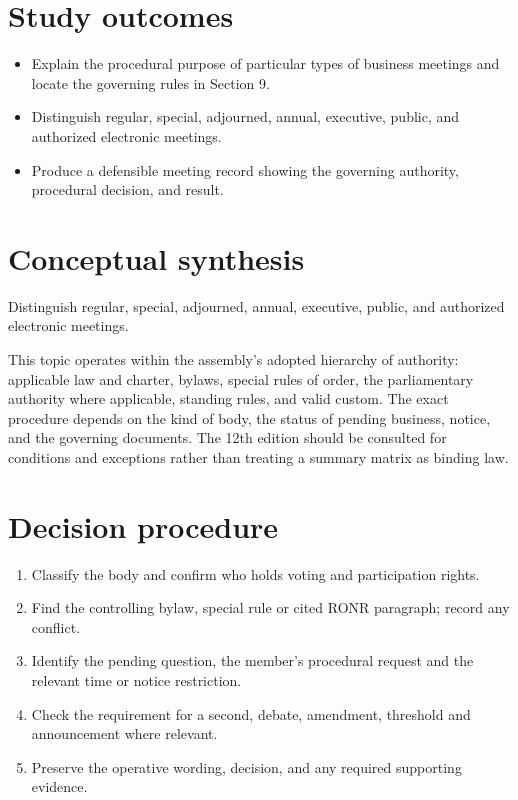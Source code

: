 \documentclass[11pt]{article}
\begin{document}
\SuiteOpen
{}
\section{Study outcomes}
\begin{itemize}[leftmargin=*,itemsep=4pt]
\item Explain the procedural purpose of particular types of business meetings and locate the governing rules in Section 9.
\item Distinguish regular, special, adjourned, annual, executive, public, and authorized electronic meetings.
\item Produce a defensible meeting record showing the governing authority, procedural decision, and result.
\end{itemize}

\section{Conceptual synthesis}
Distinguish regular, special, adjourned, annual, executive, public, and authorized electronic meetings.

This topic operates within the assembly’s adopted hierarchy of authority: applicable law and charter, bylaws, special rules of order, the parliamentary authority where applicable, standing rules, and valid custom. The exact procedure depends on the kind of body, the status of pending business, notice, and the governing documents. The 12th edition should be consulted for conditions and exceptions rather than treating a summary matrix as binding law.
\section{Decision procedure}
\begin{enumerate}[leftmargin=*,itemsep=4pt]
\item Classify the body and confirm who holds voting and participation rights.
\item Find the controlling bylaw, special rule or cited RONR paragraph; record any conflict.
\item Identify the pending question, the member’s procedural request and the relevant time or notice restriction.
\item Check the requirement for a second, debate, amendment, threshold and announcement where relevant.
\item Preserve the operative wording, decision, and any required supporting evidence.
\end{enumerate}
\end{document}
